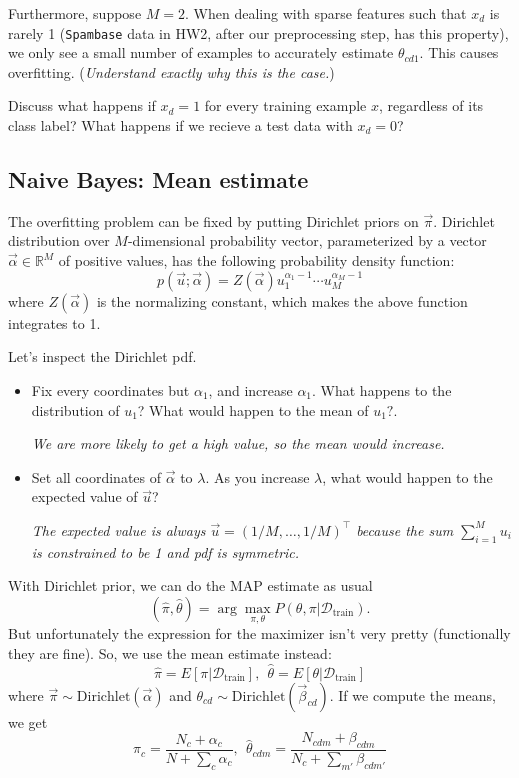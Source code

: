 \documentclass{discussion}
\begin{document}
Furthermore, suppose $M=2$. When dealing with sparse features such that $x_{d}$ is rarely 1 (\texttt{Spambase} data in HW2, after our preprocessing step, has this property), we only see a small number of examples to accurately estimate $\theta_{cd1}$.  This causes overfitting. (\emph{Understand exactly why this is the case.})

\begin{exercise}
\label{ex:always1}
  Discuss what happens if $x_d = 1$ for every training example $x$, regardless of its class label? What happens if we recieve a test data with $x_d = 0$?
\end{exercise}

\subsection{Naive Bayes: Mean estimate}
The overfitting problem can be fixed by putting Dirichlet priors on $\vec{\pi}$. Dirichlet distribution over $M$-dimensional probability vector, parameterized by a vector $\vec{\alpha} \in \mathbb{R}^{M}$ of positive values, has the following probability density function:
\[p(\vec{u}; \vec{\alpha}) = Z(\vec{\alpha}) u_{1}^{\alpha_1 - 1} \cdots u_{M}^{\alpha_{M}-1}\]
where $Z(\vec{\alpha})$ is the normalizing constant, which makes the above function integrates to 1.

\begin{exercise} Let's inspect the Dirichlet pdf.
\begin{itemize}
  \item   Fix every coordinates but $\alpha_1$, and increase $\alpha_1$. What happens to the distribution of $u_1$? What would happen to the mean of $u_1?$.

  \textit{We are more likely to get a high value, so the mean would increase.}
  \item Set all coordinates of $\vec{\alpha}$ to $\lambda$. As you increase $\lambda$, what would happen to the expected value of $\vec{u}$?

  \textit{The expected value is always $\vec{u} = (1/M, \ldots, 1/M)^\top$  because the sum $\sum_{i=1}^{M}u_i$ is constrained to be 1 and pdf is symmetric.}
\end{itemize}
\end{exercise}


With Dirichlet prior, we can do the MAP estimate as usual
\[(\hat{\pi}, \hat{\theta}) = \arg\max_{\pi,\theta} P(\theta,\pi | \mathcal{D}_{\text{train}}).\]
But unfortunately the expression for the maximizer isn't very pretty (functionally they are fine). So, we use the mean estimate instead:
\[\hat{\pi} = E[\pi| \mathcal{D}_{\text{train}}], \ \
 \hat{\theta} = E[\theta | \mathcal{D}_{\text{train}}]\]
where $\vec{\pi} \sim \text{Dirichlet}(\vec{\alpha})$ and $\theta_{cd} \sim \text{Dirichlet}(\vec{\beta}_{cd}).$ If we compute the means, we get
\[\hat{\pi}_c = \frac{N_c + \alpha_c}{N + \sum_{c} \alpha_c}, \ \ 
\hat{\theta}_{cdm} = \frac{N_{cdm} + \beta_{cdm}}{N_c + \sum_{m'} \beta_{cdm'}} \]
\end{document}
